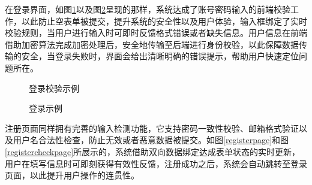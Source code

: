 \documentclass[UTF8,a4paper,12pt]{ctexart}
\numberwithin{equation}{section}
\begin{document}
在登录界面，如图\ref{logincheck}以及图\ref{loginpage}呈现的那样，系统达成了账号密码输入的前端校验工作，以此防止空表单被提交，提升系统的安全性以及用户体验，输入框绑定了实时校验规则，当用户进行输入时可即时反馈格式错误或者缺失信息。用户信息在前端借助加密算法完成加密处理后，安全地传输至后端进行身份校验，以此保障数据传输的安全，当登录失败时，界面会给出清晰明确的错误提示，帮助用户快速定位问题所在。
\begin{figure}[H]
	\caption{登录校验示例}
	\label{logincheck}
\end{figure}
\begin{figure}[H]
	\caption{登录示例}
	\label{loginpage}
\end{figure}
注册页面同样拥有完善的输入检测功能，它支持密码一致性校验、邮箱格式验证以及用户名合法性检查，防止无效或者恶意数据被提交。如图\ref{registerpage}和图\ref{registercheckpage}所展示的，系统借助双向数据绑定达成表单状态的实时更新，用户在填写信息时可即刻获得有效性反馈，注册成功之后，系统会自动跳转至登录页面，以此提升用户操作的连贯性。
\end{document}
